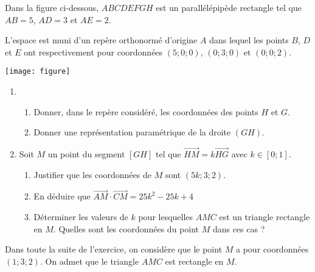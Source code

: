 \documentclass[11pt,fleqn, openany]{book} %
\begin{document}
\begin{exercise}Dans la figure ci-dessous, $ABCDEFGH$ est un parallélépipède rectangle tel que
$AB = 5$, $AD = 3$ et $AE = 2$.

L'espace est muni d'un repère orthonormé d'origine $A$ dans lequel les points $B$, $D$ et $E$ ont
respectivement pour coordonnées $(5; 0; 0)$, $(0; 3; 0)$ et $(0; 0; 2)$.

\begin{center}
\texttt{[image: figure]}
\end{center}

\begin{enumerate}
\item \begin{enumerate}
\item Donner, dans le repère considéré, les coordonnées des points $H$ et $G$.
\item Donner une représentation paramétrique de la droite $(GH)$.\end{enumerate}
\item Soit $M$ un point du segment $[GH]$ tel que $\overrightarrow{HM}=k \overrightarrow{HG}$ avec $k\in [0; 1]$.
\begin{enumerate}
\item Justifier que les coordonnées de $M$ sont $(5k ; 3 ; 2)$.
\item En déduire que $\overrightarrow{AM} \cdot \overrightarrow{CM} = 25k^2-25k+4$
\item Déterminer les valeurs de $k$ pour lesquelles $AMC$ est un triangle rectangle en $M$. Quelles sont les coordonnées du point $M$ dans ces cas ?\end{enumerate}\end{enumerate}
Dans toute la suite de l'exercice, on considère que le point $M$ a pour coordonnées $(1; 3; 2)$. On admet que le triangle $AMC$ est rectangle en $M$.


\end{exercise}
\end{document}
